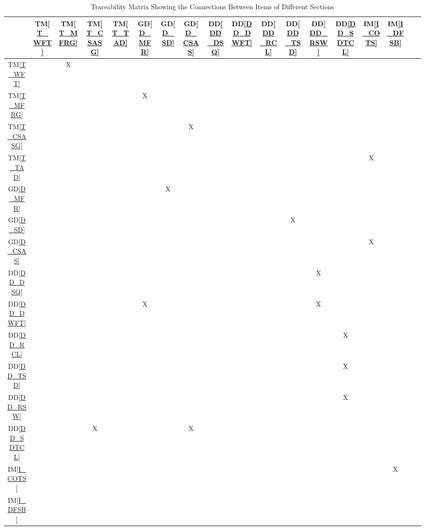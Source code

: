 \documentclass[12pt]{article}
\newcommand{\dref}[1]{GD\ref{#1}}
\newcommand{\ddref}[1]{DD\ref{#1}}
\newcommand{\tref}[1]{TM\ref{#1}}
\newcommand{\iref}[1]{IM\ref{#1}}
\begin{document}
\newpage
\begin{table}[H]
\centering
\setlength{\tabcolsep}{2pt}
\begin{tabular}{|c|c|c|c|c|c|c|c|c|c|c|c|c|c|c|c|c|c|}
\hline        
	& \tref{T_WFT} & \tref{T_MFRG} & \tref{T_CSASG} & \tref{T_TAD} & \dref{D_MFR} & \dref{D_SD}  & \dref{D_CSAS} &\ddref{DD_DSQ} & \ddref{DD_DWFT} & \ddref{DD_RCL} &  \ddref{DD_TSD} & \ddref{DD_RSW} &\ddref{DD_SDTCL} & \iref{I_COTS} & \iref{I_DFSB}\\ 
\hline

\tref{T_WFT}          & & X & & & & & & & & & & & & &  \\ \hline
\tref{T_MFRG}        & & & & & X & & & & & & & & & & \\ \hline
\tref{T_CSASG}       & & & & & & & X & & & & & & & & \\ \hline
\tref{T_TAD}           & & & & & & & & & & & & & & X &\\ \hline
\dref{D_MFR}         & & & & & & X & & & & & & & & & \\ \hline
\dref{D_SD}           & & & & & & & & & & & X & & & &\\ \hline
\dref{D_CSAS}       & & & & & & & & & & & & & & X &\\ \hline
\ddref{DD_DSQ}    & & & & & & & & & & & & X & & &\\ \hline
\ddref{DD_DWFT}  & & & & & X & & & & & & & X & & &\\ \hline
\ddref{DD_RCL}    & & & & & & & & & & & & & X & &\\ \hline
\ddref{DD_TSD}    & & & & & & & & & & & & & X & &\\ \hline
\ddref{DD_RSW}    & & & & & & & & & & & & & X & & \\ \hline
\ddref{DD_SDTCL}  & & & X & & & & X & & & & & & & &\\ \hline
\iref{I_COTS}         & & & & & & & & & & & & & & & X \\ \hline
\iref{I_DFSB}         & & & & & & & & & & & & & & &\\ 
\hline
\end{tabular}
\caption{Traceability Matrix Showing the Connections Between Items of Different Sections}
\label{Table:A_trace}
\end{table}
\end{document}
